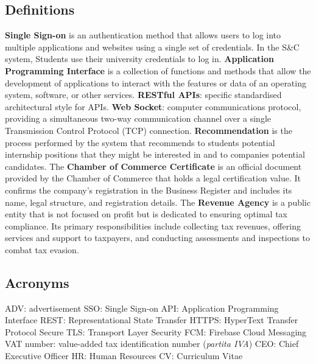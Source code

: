 \subsection{Definitions}
\textbf{Single Sign-on} is an authentication method that allows users to log into multiple applications and websites using a single set of credentials. In the S\&C system, Students use their university credentials to log in.\newline
\textbf{Application Programming Interface} is a collection of functions and methods that allow the development of applications to interact with the features or data of an operating system, software, or other services.\newline
\textbf{RESTful APIs}: specific standardised architectural style for APIs.\newline
\textbf{Web Socket}: computer communications protocol, providing a simultaneous two-way communication channel over a single Transmission Control Protocol (TCP) connection.\newline
\textbf{Recommendation} is the process performed by the system that recommends to students potential internship positions that they might be interested in and to companies potential candidates.\newline
The \textbf{Chamber of Commerce Certificate} is an official document provided by the Chamber of Commerce that holds a legal certification value. It confirms the company's registration in the Business Register and includes its name, legal structure, and registration details.\newline
The \textbf{Revenue Agency} is a public entity that is not focused on profit but is dedicated to ensuring optimal tax compliance. Its primary responsibilities include collecting tax revenues, offering services and support to taxpayers, and conducting assessments and inspections to combat tax evasion.
\subsection{Acronyms}
ADV: advertisement\newline
SSO: Single Sign-on \newline
API: Application Programming Interface\newline
REST: Representational State Transfer\newline
HTTPS: HyperText Transfer Protocol Secure\newline
TLS: Transport Layer Security \newline
FCM: Firebase Cloud Messaging \newline
VAT number: value-added tax identification number (\textit {partita IVA})\newline
CEO: Chief Executive Officer \newline
HR: Human Resources\newline
CV: Curriculum Vitae
